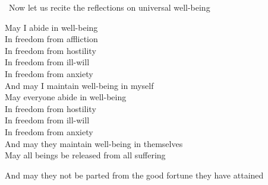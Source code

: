 \clearpage

\begin{leader-english}
  \anglebracketleft\ \hspace{-0.5mm}Now let us recite the reflections on universal well-being \hspace{-0.5mm}\anglebracketright\
\end{leader-english}

\begin{english-verses}
  May I abide in well-being\\
  In freedom from affliction\\
  In freedom from hostility\\
  In freedom from ill-will\\
  In freedom from anxiety\\
  And may I maintain well-being in myself\\
  May everyone abide in well-being\\
  In freedom from hostility\\
  In freedom from ill-will\\
  In freedom from anxiety\\
  And may they maintain well-being in themselves\\
  May all beings be released from all suffering\\
  \begin{english-hangtogether}
    And may they not be parted from the good fortune they have attained\makeatletter\hyperlink{endnote95-appendix}\makeatother
  \end{english-hangtogether}
\end{english-verses}

